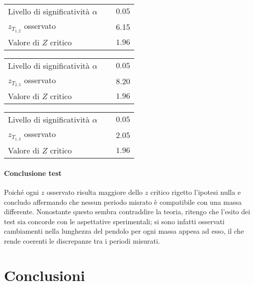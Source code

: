 \documentclass{article}
\begin{document}
		\vspace{0.7cm}
	\begin{minipage}{0.5\textwidth}
		\begin{table}[H]
			\centering
			\begin{tabular}{lr} 
				Livello di significatività $\alpha$		&$\quad 0.05$  \\
				$z_{T_{1,2}}$ osservato 					& $\quad$ 6.15 \\
				Valore di $Z$ critico     	& $\quad 1.96$
			\end{tabular}
		\end{table}
	\end{minipage}
	\begin{minipage}{0.5\textwidth}
		\begin{table}[H]
			\centering
			\begin{tabular}{lr} 
				Livello di significatività $\alpha$		&$\quad 0.05$  \\
				$z_{T_{2,3}}$ osservato 					& $\quad$ 8.20 \\
				Valore di $Z$ critico     	& $\quad 1.96$
			\end{tabular}
		\end{table}
	\end{minipage}
	\begin{table}[H]
		\centering
		\begin{tabular}{lr} 
			Livello di significatività $\alpha$		&$\quad 0.05$  \\
			$z_{T_{1,3}}$ osservato 					& $\quad$ 2.05 \\
			Valore di $Z$ critico     	& $\quad 1.96$
		\end{tabular}
	\end{table}
	
	\paragraph{Conclusione test} Poiché ogni $z$ osservato risulta maggiore dello $z$ critico rigetto l'ipotesi nulla e concludo affermando che nessun periodo misrato è compatibile con una massa differente. Nonostante questo sembra contraddire la teoria, ritengo che l'esito dei test sia concorde con le aspettative sperimentali; si sono infatti osservati cambiamenti nella lunghezza del pendolo per ogni massa appesa ad esso, il che rende coerenti le discrepanze tra i periodi misurati.
	
	
	\newpage
	\section{Conclusioni}
	
	
	
\end{document}
